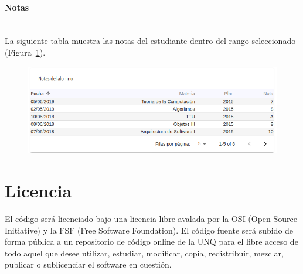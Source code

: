 \paragraph{Notas} \mbox{}\\
La siguiente tabla muestra las notas del estudiante dentro del rango seleccionado (Figura~\ref{fig:sa-notas}).

\begin{figure}[H]
  \centering
    \includegraphics[scale=0.4]{images/seguimiento-academico/sa-notas.png}
  \label{fig:sa-notas}
\end{figure}



\section{Licencia}
El código será licenciado bajo una licencia libre avalada por la OSI (Open Source Initiative) y la
FSF (Free Software Foundation). El código fuente será subido de forma pública a un repositorio
de código online de la UNQ para el libre acceso de todo aquel que desee utilizar, estudiar,
modificar, copia, redistribuir, mezclar, publicar o sublicenciar el software en cuestión.